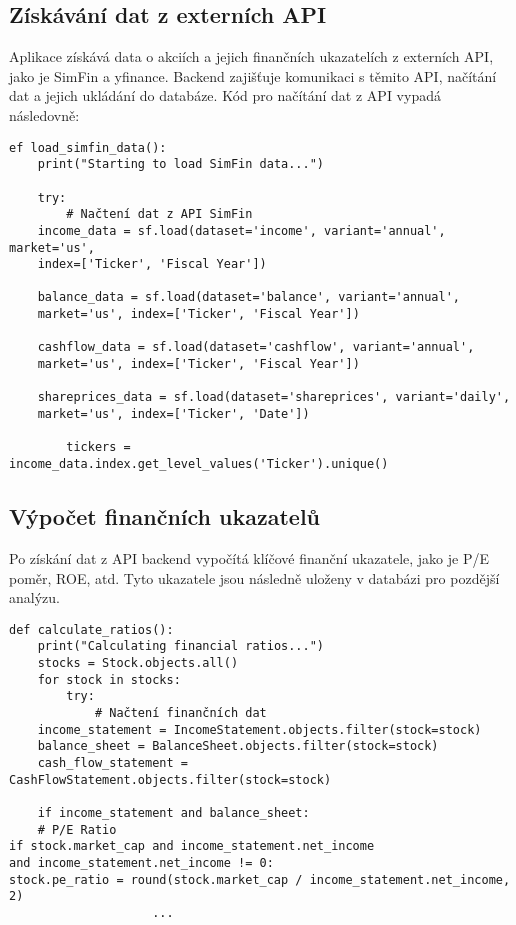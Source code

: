 \documentclass[12pt, a4paper]{report}
\begin{document}
\subsection{Získávání dat z externích API}

Aplikace získává data o akciích a jejich finančních ukazatelích z externích API, jako je SimFin a yfinance. Backend zajišťuje komunikaci s těmito API, načítání dat a jejich ukládání do databáze. Kód pro načítání dat z API vypadá následovně:

\begin{lstlisting}[style=Python, caption= Kód pro získávání dat z API]
ef load_simfin_data():
    print("Starting to load SimFin data...")

    try:
        # Načtení dat z API SimFin
    income_data = sf.load(dataset='income', variant='annual', market='us', 
    index=['Ticker', 'Fiscal Year'])
    
    balance_data = sf.load(dataset='balance', variant='annual',
    market='us', index=['Ticker', 'Fiscal Year'])
    
    cashflow_data = sf.load(dataset='cashflow', variant='annual',
    market='us', index=['Ticker', 'Fiscal Year'])
    
    shareprices_data = sf.load(dataset='shareprices', variant='daily', 
    market='us', index=['Ticker', 'Date'])

        tickers = income_data.index.get_level_values('Ticker').unique()
\end{lstlisting}

\subsection{Výpočet finančních ukazatelů}

Po získání dat z API backend vypočítá klíčové finanční ukazatele, jako je P/E poměr, ROE, atd. Tyto ukazatele jsou následně uloženy v databázi pro pozdější analýzu.

\begin{lstlisting}[style=Python, caption= Kód pro výpočet finančních ukazatelů]
def calculate_ratios():
    print("Calculating financial ratios...")
    stocks = Stock.objects.all()
    for stock in stocks:
        try:
            # Načtení finančních dat
    income_statement = IncomeStatement.objects.filter(stock=stock)
    balance_sheet = BalanceSheet.objects.filter(stock=stock)
    cash_flow_statement = CashFlowStatement.objects.filter(stock=stock)

    if income_statement and balance_sheet:
    # P/E Ratio
if stock.market_cap and income_statement.net_income 
and income_statement.net_income != 0:
stock.pe_ratio = round(stock.market_cap / income_statement.net_income, 2)
                    ...
\end{lstlisting}
\end{document}
